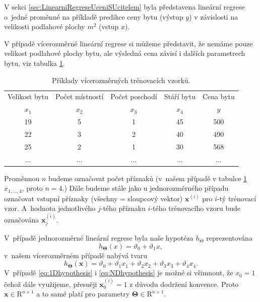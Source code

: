 \par{V sekci \ref{sec:LinearniRegreseUceniSUcitelem} byla představena lineární regrese o~jedné proměnné na příkladě predikce ceny bytu (výstup $y$) v závislosti na velikosti podlahové plochy $m^2$ (vstup $x$).}

\par{V případě vícerozměrné lineární regrese si můžeme představit, že nemáme pouze velikost podlahové plochy bytu, ale výsledná cena závisí i dalších parametrech bytu, viz tabulka \ref{tab:vzorkyND}.

\begin{table}[!ht]
\centering
\begin{tabular}{c|c|c|c|c}
	{Velikost bytu} & {Počet místností} & {Počet poschodí} & {Stáří bytu} & {Cena bytu}\\
	{$x_1$} & {$x_2$} & {$x_3$} & {$x_4$} & {$y$}\\
	\hline
	{19} & {5} & {1} & {45} & {500}\\
	{22} & {3} & {2} & {40} & {490}\\
	{25} & {2} & {1} & {30} & {568}\\
	{$\ldots$} & {$\ldots$} & {$\ldots$} & {$\ldots$} & {$\ldots$}
\end{tabular}
\caption{Příklady vícerozměrných trénovacích vzorků.}
\label{tab:vzorkyND}
\end{table}}

\par{Proměnnou $n$ budeme označovat počet příznaků (v~našem případě v tabulce \ref{tab:vzorkyND} $x_{1, \ldots , 4}$, proto $n = 4$.) Dále budeme stále jako u jednorozměrného případu označovat vstupní příznaky (všechny = sloupcový vektor) $\bm{x}^{\left( i \right)}$ pro $i$-tý trénovací vzor. A~hodnota jednotlivého $j$-tého příznaku $i$-tého trénovacího vzoru bude označována $\bm{x}^{\left( i \right)}_{j}$.}

\par{V~případě jednorozměrné lineární regrese byla naše hypotéza $h_\Theta$ reprezentována
\begin{equation}
	h_{\bm{\Theta}} \left( x \right) = \vartheta_0 + \vartheta_1 x,
	\label{eq:1Dhypothesis}
\end{equation}
v~našem vícerozměrném případě nabývá tvaru
\begin{equation}
	h_{\bm{\Theta}} \left( \bm{x} \right) = \vartheta_0 + \vartheta_1 x_1 + \vartheta_2 x_2 + \vartheta_3 x_3 + \vartheta_4 x_4 .
	\label{eq:NDhypothesis}
\end{equation}
V~případě \ref{eq:1Dhypothesis} i \ref{eq:NDhypothesis} je možné si všimnout, že $x_0 = 1$ čehož dále využijeme, přesněji $\bm{x}^{\left( i \right)}_0 = 1$ z důvodu dodržení konvence. Proto $\bm{x} \in \mathrm{R}^{n + 1}$ a to samé platí pro parametry $\bm{\Theta} \in \mathrm{R}^{n + 1}$.}

